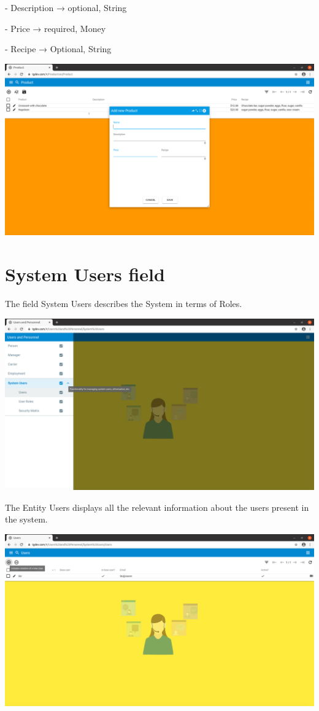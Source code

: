 - Description → optional, String

- Price → required, Money

- Recipe → Optional, String

\includegraphics[width=\textwidth]{sections/01-chapter/images/product12.png}

\section{System Users field}

The field System Users describes the System in terms of Roles. 

\includegraphics[width=\textwidth]{sections/01-chapter/images/system11.png}

The Entity Users displays all the relevant information about the users present in the system.

\includegraphics[width=\textwidth]{sections/01-chapter/images/system12.png}

